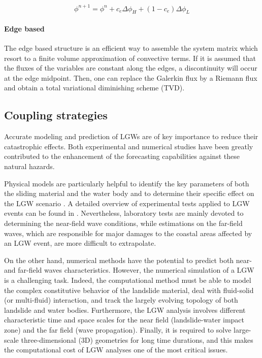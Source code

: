 \begin{equation}
\phi^{n+1} = \phi^n + c_e\Delta \phi_H + (1-c_e)\Delta \phi_L
\end{equation}

\paragraph*{Edge based} The edge based structure is an efficient way to assemble the system matrix which resort to a
finite volume approximation of convective terms. If it is assumed that the fluxes of the variables are constant along the edges, a discontinuity will occur at the edge midpoint. Then, one can replace the Galerkin flux by a Riemann flux and obtain a total variational diminishing scheme (TVD).





\subsection{Coupling strategies}


Accurate modeling and prediction of LGWs are of key importance to reduce their catastrophic effects.
Both experimental and numerical studies have been greatly contributed to the enhancement of the forecasting capabilities against these natural hazards.

Physical models are particularly helpful to identify the key parameters of both the sliding material and the water body and to determine their specific effect on the LGW scenario \cite{noda1970water, fritz2004near, heller2011wave, mohammed2012physical, romano2016, mulligan2017, evers2019spatial}. A detailed overview of experimental tests applied to LGW events can be found in \cite{yavari2017subaerial}. Nevertheless, laboratory tests are mainly devoted to determining the near-field wave conditions, while estimations on the far-field waves, which are responsible for major damages to the coastal areas affected by an LGW event, are more difficult to extrapolate.

On the other hand, numerical methods have the potential to predict both near- and far-field waves characteristics. However, the numerical simulation of a LGW is a challenging task. Indeed, the computational method must be able to model the complex constitutive behavior of the landslide material, deal with fluid-solid (or multi-fluid) interaction, and track the largely evolving topology of both landslide and water bodies. Furthermore, the LGW analysis involves different characteristic time and space scales for the near field (landslide-water impact zone) and the far field (wave propagation). Finally, it is required to solve large-scale three-dimensional (3D) geometries for long time durations, and this makes the computational cost of LGW analyses one of the most critical issues.

